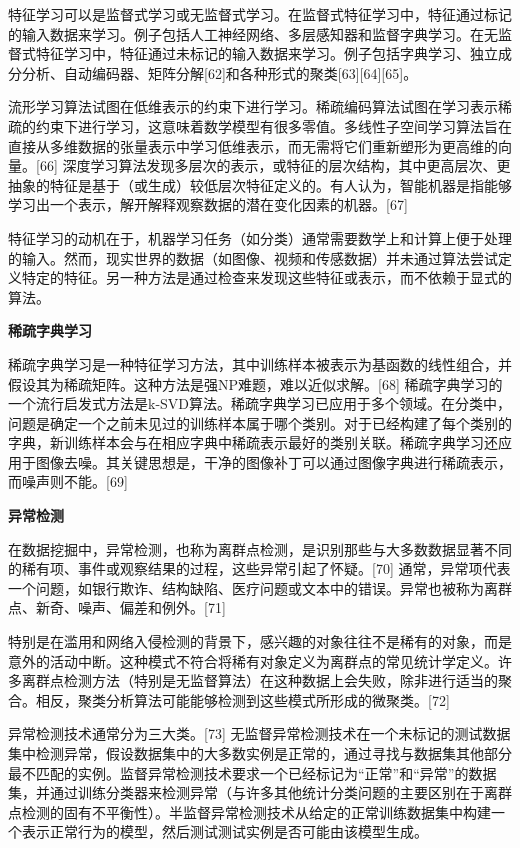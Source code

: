 特征学习可以是监督式学习或无监督式学习。在监督式特征学习中，特征通过标记的输入数据来学习。例子包括人工神经网络、多层感知器和监督字典学习。在无监督式特征学习中，特征通过未标记的输入数据来学习。例子包括字典学习、独立成分分析、自动编码器、矩阵分解[62]和各种形式的聚类[63][64][65]。

流形学习算法试图在低维表示的约束下进行学习。稀疏编码算法试图在学习表示稀疏的约束下进行学习，这意味着数学模型有很多零值。多线性子空间学习算法旨在直接从多维数据的张量表示中学习低维表示，而无需将它们重新塑形为更高维的向量。[66] 深度学习算法发现多层次的表示，或特征的层次结构，其中更高层次、更抽象的特征是基于（或生成）较低层次特征定义的。有人认为，智能机器是指能够学习出一个表示，解开解释观察数据的潜在变化因素的机器。[67]

特征学习的动机在于，机器学习任务（如分类）通常需要数学上和计算上便于处理的输入。然而，现实世界的数据（如图像、视频和传感数据）并未通过算法尝试定义特定的特征。另一种方法是通过检查来发现这些特征或表示，而不依赖于显式的算法。

\textbf{稀疏字典学习}

稀疏字典学习是一种特征学习方法，其中训练样本被表示为基函数的线性组合，并假设其为稀疏矩阵。这种方法是强NP难题，难以近似求解。[68] 稀疏字典学习的一个流行启发式方法是k-SVD算法。稀疏字典学习已应用于多个领域。在分类中，问题是确定一个之前未见过的训练样本属于哪个类别。对于已经构建了每个类别的字典，新训练样本会与在相应字典中稀疏表示最好的类别关联。稀疏字典学习还应用于图像去噪。其关键思想是，干净的图像补丁可以通过图像字典进行稀疏表示，而噪声则不能。[69]

\textbf{异常检测}

在数据挖掘中，异常检测，也称为离群点检测，是识别那些与大多数数据显著不同的稀有项、事件或观察结果的过程，这些异常引起了怀疑。[70] 通常，异常项代表一个问题，如银行欺诈、结构缺陷、医疗问题或文本中的错误。异常也被称为离群点、新奇、噪声、偏差和例外。[71]

特别是在滥用和网络入侵检测的背景下，感兴趣的对象往往不是稀有的对象，而是意外的活动中断。这种模式不符合将稀有对象定义为离群点的常见统计学定义。许多离群点检测方法（特别是无监督算法）在这种数据上会失败，除非进行适当的聚合。相反，聚类分析算法可能能够检测到这些模式所形成的微聚类。[72]

异常检测技术通常分为三大类。[73] 无监督异常检测技术在一个未标记的测试数据集中检测异常，假设数据集中的大多数实例是正常的，通过寻找与数据集其他部分最不匹配的实例。监督异常检测技术要求一个已经标记为“正常”和“异常”的数据集，并通过训练分类器来检测异常（与许多其他统计分类问题的主要区别在于离群点检测的固有不平衡性）。半监督异常检测技术从给定的正常训练数据集中构建一个表示正常行为的模型，然后测试测试实例是否可能由该模型生成。


